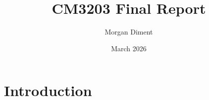 \documentclass{article}
\title{CM3203 Final Report}
\author{Morgan Diment}
\date{March 2026}
\begin{document}
\maketitle

\section{Introduction}
\end{document}
